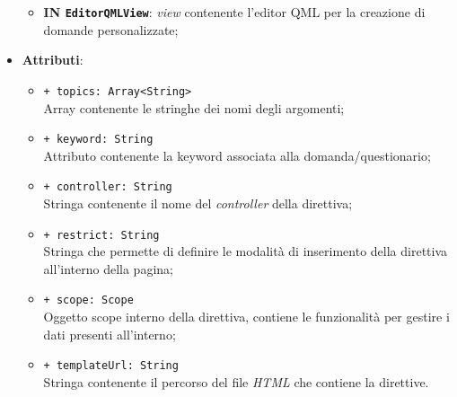 \begin{itemize}
\begin{itemize}
		\item \textbf{IN \texttt{EditorQMLView}}: \textit{view} contenente l'editor QML per la creazione di domande personalizzate;
	\end{itemize}
	\item \textbf{Attributi}:
	\begin{itemize}
		\item \texttt{+ topics: Array<String>} \\ Array contenente le stringhe dei nomi degli argomenti;
		\item \texttt{+ keyword: String} \\ Attributo contenente la keyword associata alla domanda/questionario;
		\item \texttt{+ controller: String} \\ Stringa contenente il nome del \textit{controller} della direttiva;
		\item \texttt{+ restrict: String} \\ Stringa che permette di definire le modalità di inserimento della direttiva all'interno della pagina;
		\item \texttt{+ scope: Scope} \\ Oggetto scope interno della direttiva, contiene le funzionalità per gestire i dati presenti all'interno;
		\item \texttt{+ templateUrl: String} \\ Stringa contenente il percorso del file \textit{HTML} che contiene la direttive.
	\end{itemize}
\end{itemize}